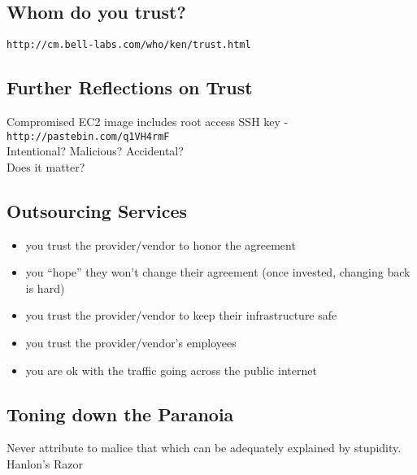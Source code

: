 \documentclass[xga]{xdvislides}
\begin{document}
\subsection{Whom do you trust?}
\vspace*{\fill}
\begin{center}
	\verb+http://cm.bell-labs.com/who/ken/trust.html+
\end{center}
\vspace*{\fill}

\subsection{Further Reflections on Trust}
Compromised EC2 image includes root access SSH key -
{\tt http://pastebin.com/q1VH4rmF}
\\

Intentional? Malicious? Accidental?
\\

Does it matter?

\subsection{Outsourcing Services}
\begin{itemize}
	\item you trust the provider/vendor to honor the agreement
	\item you ``hope'' they won't change their agreement (once
		invested, changing back is hard)
	\item you trust the provider/vendor to keep their infrastructure
		safe
	\item you trust the provider/vendor's employees
	\item you are ok with the traffic going across the public internet
\end{itemize}

\subsection{Toning down the Paranoia}
\vspace*{\fill}
\Huge
\begin{center}
Never attribute to malice that which can be adequately explained by stupidity. \\
\vspace{.25in}
\Normalsize
Hanlon's Razor
\end{center}
\Normalsize
\vspace*{\fill}
\end{document}
